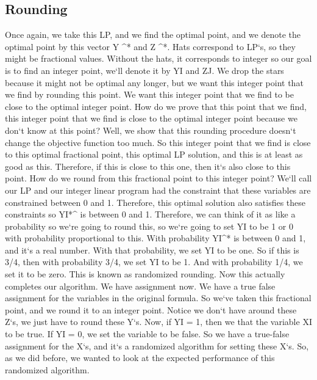 \subsection{Rounding}
Once again, we take this LP, and we find the optimal point, and we denote the optimal point by this vector Y \textasciicircum{}* and Z \textasciicircum{}*.
Hats correspond to LP`s, so they might be fractional values.
Without the hats, it corresponds to integer so our goal is to find an integer point, we`ll denote it by YI and ZJ\@.
We drop the stars because it might not be optimal any longer, but we want this integer point that we find by rounding this point.
We want this integer point that we find to be close to the optimal integer point.
How do we prove that this point that we find, this integer point that we find is close to the optimal integer point because we don`t know at this point? Well, we show that this rounding procedure doesn`t change the objective function too much.
So this integer point that we find is close to this optimal fractional point, this optimal LP solution, and this is at least as good as this.
Therefore, if this is close to this one, then it`s also close to this point.
How do we round from this fractional point to this integer point? We`ll call our LP and our integer linear program had the constraint that these variables are constrained between 0 and 1.
Therefore, this optimal solution also satisfies these constraints so YI*\textasciicircum{} is between 0 and 1.
Therefore, we can think of it as like a probability so we`re going to round this, so we`re going to set YI to be 1 or 0 with probability proportional to this.
With probability YI\textasciicircum{}* is between 0 and 1, and it`s a real number.
With that probability, we set YI to be one.
So if this is 3/4, then with probability 3/4, we set YI to be 1.
And with probability 1/4, we set it to be zero.
This is known as randomized rounding.
Now this actually completes our algorithm.
We have assignment now.
We have a true false assignment for the variables in the original formula.
So we`ve taken this fractional point, and we round it to an integer point.
Notice we don`t have around these Z`s, we just have to round these Y`s.
Now, if YI = 1, then we that the variable XI to be true.
If YI = 0, we set the variable to be false.
So we have a true-false assignment for the X`s, and it`s a randomized algorithm for setting these X`s.
So, as we did before, we wanted to look at the expected performance of this randomized algorithm.

